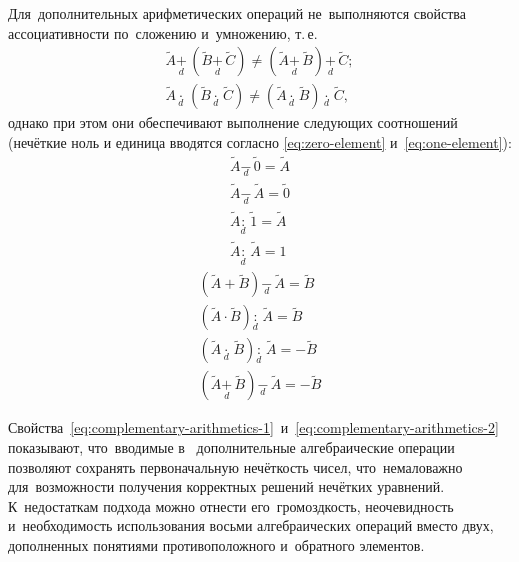 Для~дополнительных арифметических операций не~выполняются свойства ассоциативности по~сложению и~умножению, т.\,е.
\begin{gather*}
		\tilde{A}\underset{d}{\mathop{+}}\,\left( \tilde{B}\underset{d}{\mathop{+}}\,\tilde{C} \right)\ne \left( \tilde{A}\underset{d}{\mathop{+}}\,\tilde{B} \right)\underset{d}{\mathop{+}}\,\tilde{C}; \\ 
		\tilde{A}\underset{d}{\mathop{\cdot }}\,\left( \tilde{B}\underset{d}{\mathop{\cdot }}\,\tilde{C} \right)\ne \left( \tilde{A}\underset{d}{\mathop{\cdot }}\,\tilde{B} \right)\underset{d}{\mathop{\cdot }}\,\tilde{C},
\end{gather*}
однако при этом они обеспечивают выполнение следующих соотношений (нечёткие ноль и единица вводятся согласно \eqref{eq:zero-element} и~\eqref{eq:one-element}):
\begin{equation}
\label{eq:complementary-arithmetics-1}
\begin{matrix}
  \tilde{A}\underset{d}{\mathop{-}}\,\tilde{0}=\tilde{A} \\ 
  \tilde{A}\underset{d}{\mathop{-}}\,\tilde{A}=\tilde{0} \\ 
  \tilde{A}\underset{d}{\mathop{:}}\,\tilde{1}=\tilde{A} \\ 
  \tilde{A}\underset{d}{\mathop{:}}\,\tilde{A}=1 
\end{matrix}
\end{equation}
\begin{equation}
\label{eq:complementary-arithmetics-2}
\begin{matrix}
  \left( \tilde{A}+\tilde{B} \right)\underset{d}{\mathop{-}}\,\tilde{A}=\tilde{B} \\ 
  \left( \tilde{A}\cdot \tilde{B} \right)\underset{d}{\mathop{:}}\,\tilde{A}=\tilde{B} \\ 
  \left( \tilde{A}\underset{d}{\mathop{\cdot }}\,\tilde{B} \right)\underset{d}{\mathop{:}}\,\tilde{A}=-\tilde{B} \\ 
  \left( \tilde{A}\underset{d}{\mathop{+}}\,\tilde{B} \right)\underset{d}{\mathop{-}}\,\tilde{A}=-\tilde{B} 
\end{matrix}
\end{equation}

Свойства~\eqref{eq:complementary-arithmetics-1}~и~\eqref{eq:complementary-arithmetics-2} показывают, что~вводимые в~\cite{Piter_SCM} дополнительные алгебраические операции позволяют сохранять первоначальную нечёткость чисел, что~немаловажно для~возможности получения корректных решений нечётких уравнений. К~недостаткам подхода можно отнести его~громоздкость, неочевидность и~необходимость использования восьми алгебраических операций вместо двух, дополненных понятиями противоположного и~обратного элементов.

